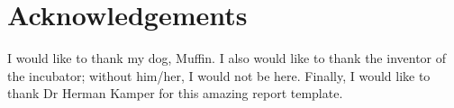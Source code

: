 \chapter*{Acknowledgements}
\makeatletter{}\makeatother

I would like to thank my dog, Muffin. I also would like to thank the inventor of the incubator; without him/her, I would not be here. Finally, I would like to thank Dr Herman Kamper for this amazing report template.
